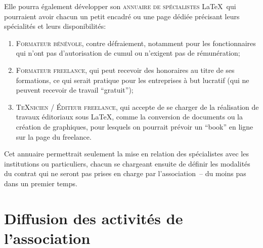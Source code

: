 \documentclass{tufte-handout}
\newcommand{\ratio}[3][]{\marginpar{\footnotesize{\textcolor{teal}{Temps requis: #2 / Utilité: #3}\par\noindent \textcolor{teal}{#1}}}}
\begin{document}
Elle pourra également\ratio[Gestion par les intéressés, autorisés par les
administrateurs du site web]{+}{++} développer son \textsc{annuaire de
  spécialistes} \LaTeX\ qui pourraient avoir chacun un petit encadré ou une page
dédiée précisant leurs spécialités et leurs disponibilités:
\begin{enumerate}
\item\textsc{Formateur bénévole}, contre défraiement, notamment pour les
  fonctionnaires qui n'ont pas d'autorisation de cumul ou n'exigent pas de
  rémunération;
\item\textsc{Formateur freelance}, qui peut recevoir des honoraires au titre de
  ses formations, ce qui serait pratique pour les entreprises à but lucratif
  (qui ne peuvent recevoir de travail \enquote{gratuit});
\item\textsc{\TeX nicien / Éditeur freelance}, qui accepte de se charger de la
  réalisation de travaux éditoriaux sous \LaTeX, comme la conversion de
  documents ou la création de graphiques, pour lesquels on pourrait prévoir un
  \enquote{book} en ligne sur la page du freelance.
\end{enumerate}

Cet annuaire permettrait seulement la mise en relation des spécialistes avec les
institutions ou particuliers, chacun se chargeant ensuite de définir les
modalités du contrat qui ne seront pas prises en charge par l'association~-- du
moins pas dans un premier temps.


\section{Diffusion des activités de l'association}
\end{document}
